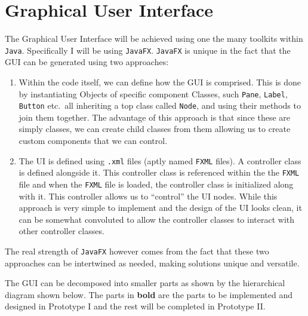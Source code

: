\documentclass[../../../../main.tex]{subfiles}
\begin{document}
\section{Graphical User Interface}
The Graphical User Interface will be achieved using one the many toolkits within \texttt{Java}. Specifically I will be using \texttt{JavaFX\cite{javafx}}. \texttt{JavaFX} is unique in the fact that the GUI can be generated using two approaches:
\begin{enumerate}
\item Within the code itself, we can define how the GUI\cite{javafxEx} is comprised. This is done by instantiating Objects of specific component Classes, such \texttt{Pane}, \texttt{Label}, \texttt{Button} etc.\ all inheriting a top class called \texttt{Node}, and using their methods to join them together. The advantage of this approach is that since these are simply classes, we can create child classes from them allowing us to create custom components that we can control.
\item The UI is defined using \texttt{.xml} files (aptly named \texttt{FXML\cite{fxml}} files). A controller class is defined alongside it. This controller class is referenced within the the \texttt{FXML} file and when the \texttt{FXML} file is loaded, the controller class is initialized along with it. This controller allows us to ``control'' the UI nodes. While this approach is very simple to implement and the design of the UI looks clean, it can be somewhat convoluted to allow the controller classes to interact with other controller classes.
\end{enumerate}
The real strength of \texttt{JavaFX} however comes from the fact that these two approaches can be intertwined as needed, making solutions unique and versatile. 

The GUI can be decomposed into smaller parts as shown by the hierarchical diagram shown below. The parts in \textbf{bold} are the parts to be implemented and designed in Prototype I and the rest will be completed in Prototype II.
\end{document}
